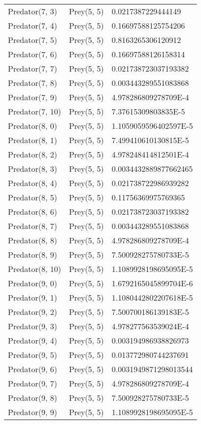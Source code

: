 \begin{longtable}{| p{} | p{} | p{} |}
Predator(7, 3) & Prey(5, 5) &0.0217387229444149\\
Predator(7, 4) & Prey(5, 5) &0.16697588125754206\\
Predator(7, 5) & Prey(5, 5) &0.8163265306120912\\
Predator(7, 6) & Prey(5, 5) &0.16697588126158314\\
Predator(7, 7) & Prey(5, 5) &0.021738723037193382\\
Predator(7, 8) & Prey(5, 5) &0.003443289551083868\\
Predator(7, 9) & Prey(5, 5) &4.978286809278709E-4\\
Predator(7, 10) & Prey(5, 5) &7.37615309803835E-5\\
Predator(8, 0) & Prey(5, 5) &1.1059059596402597E-5\\
Predator(8, 1) & Prey(5, 5) &7.499410610130815E-5\\
Predator(8, 2) & Prey(5, 5) &4.978248414812501E-4\\
Predator(8, 3) & Prey(5, 5) &0.0034432889877662465\\
Predator(8, 4) & Prey(5, 5) &0.021738722986939282\\
Predator(8, 5) & Prey(5, 5) &0.11756369975769365\\
Predator(8, 6) & Prey(5, 5) &0.021738723037193382\\
Predator(8, 7) & Prey(5, 5) &0.003443289551083868\\
Predator(8, 8) & Prey(5, 5) &4.978286809278709E-4\\
Predator(8, 9) & Prey(5, 5) &7.500928275780733E-5\\
Predator(8, 10) & Prey(5, 5) &1.1089928198695095E-5\\
Predator(9, 0) & Prey(5, 5) &1.6792165045899704E-6\\
Predator(9, 1) & Prey(5, 5) &1.1080442802207618E-5\\
Predator(9, 2) & Prey(5, 5) &7.500700186139183E-5\\
Predator(9, 3) & Prey(5, 5) &4.978277563539024E-4\\
Predator(9, 4) & Prey(5, 5) &0.003194986938826973\\
Predator(9, 5) & Prey(5, 5) &0.013772980744237691\\
Predator(9, 6) & Prey(5, 5) &0.0031949871298013544\\
Predator(9, 7) & Prey(5, 5) &4.978286809278709E-4\\
Predator(9, 8) & Prey(5, 5) &7.500928275780733E-5\\
Predator(9, 9) & Prey(5, 5) &1.1089928198695095E-5\\

\end{longtable}
